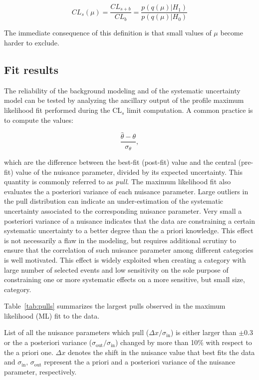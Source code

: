 \begin{equation}
CL_s(\mu) = \dfrac{CL_{s+b}}{CL_b} = \dfrac{p(q(\mu) | H_1)}{p(q(\mu) | H_0)}
\end{equation}

The immediate consequence of this definition is that small values of $\mu$ become harder to exclude.

\subsection{Fit results}

The reliability of the background modeling and of the systematic uncertainty model can be tested by analyzing the ancillary output of the profile maximum likelihood fit performed during the CL$_s$ limit computation. A common practice is to compute the values:

\begin{equation}
\dfrac{\hat{\theta} - \theta}{\sigma_{\theta}},
\end{equation}

which are the difference between the best-fit (post-fit) value and the central (pre-fit) value of the nuisance parameter, divided by its expected uncertainty. This quantity is commonly referred to as \emph{pull}. The maximum likelihood fit also evaluates the a posteriori variance of each nuisance parameter. Large outliers in the pull distribution can indicate an under-estimation of the systematic uncertainty associated to the corresponding nuisance parameter. Very small a posteriori variance of a nuisance indicates that the data are constraining a certain systematic uncertainty to a better degree than the a priori knowledge. This effect is not necessarily a flaw in the modeling, but requires additional scrutiny to ensure that the correlation of such nuisance parameter among different categories is well motivated. This effect is widely exploited when creating a category with large number of selected events and low sensitivity on the sole purpose of constraining one or more systematic effects on a more sensitive, but small size, category. 

Table~\ref{tab:pulls} summarizes the largest pulls observed in the maximum likelihood (ML) fit to the data.

\begin{table}
\caption{List of all the nuisance parameters which pull ($\Delta x/\sigma_{\text{in}}$) is either larger than $\pm0.3$ or the a posteriori variance ($\sigma_{\text{out}}/\sigma_{\text{in}}$) changed by more than 10\% with respect to the a priori one. $\Delta x$ denotes the shift in the nuisance value that best fits the data and $\sigma_{\text{in}}, \,\sigma_{\text{out}}$ represent the a priori and a posteriori variance of the nuisance parameter, respectively.}

\label{tab:pulls}
\end{table}

